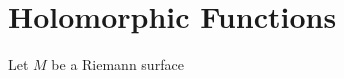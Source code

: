 \documentclass[../Moduli_Spaces_of_Riemann_Surfaces.tex]{subfiles}
\begin{document}
    \section{Holomorphic Functions}
    \begin{definition}
        Let $M$ be a Riemann surface
    \end{definition}
\end{document}
